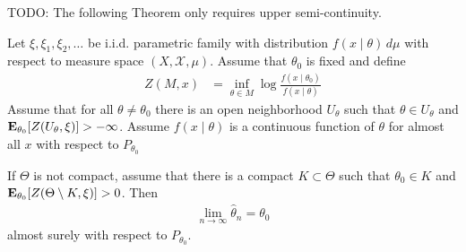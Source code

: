 TODO: The following Theorem only requires upper semi-continuity.
\begin{thm}Let $\xi, \xi_1, \xi_2, \dots$ be i.i.d. parametric
  family with distribution $f(x \mid \theta) \, d \mu$ with respect to measure
  space $(X, \mathcal{X}, \mu)$.  Assume that  $\theta_0$ is fixed and
  define 
\begin{align*}
Z(M, x) &= \inf_{\theta \in M} \log \frac{f(x \mid \theta_0)}{f(x \mid \theta)}
\end{align*}
Assume that for all $\theta \neq \theta_0$ there is an open neighborhood $U_\theta$
such that $\theta \in U_\theta$ and $\sexpectation{Z(U_\theta, \xi)}{\theta_0} >
-\infty$.  Assume $f(x \mid \theta)$ is
  a continuous function of $\theta$ for almost all $x$ with respect to
  $P_{\theta_0}$

If $\Theta$ is not compact, assume that there is a compact $K \subset
\Theta$ such that $\theta_0 \in K$ and $\sexpectation{Z(\Theta
  \setminus K, \xi)}{\theta_0} > 0$.  Then 
\begin{align*}
\lim_{n \to \infty} \hat{\theta}_n = \theta_0
\end{align*}
almost surely with respect to $P_{\theta_0}$.
\end{thm}

